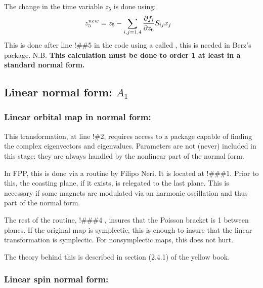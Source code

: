 \documentclass{hitec}     %
\begin{document}
{{{{{{The change in the time variable $z_5$ is done using:
%
\begin{align} {z}_{5}^{new}&={z}_{5}-\sum\limits_{i,j=1,4}^{} {\partial {f}_{i} \over \partial {z}_{6}}{S}_{ij}{x}_{j}\label{tlie5}\end{align}
%
This is done after line !\#\#5 in the code using a  called , this is needed in Berz's package.
\vskip 0.5cm
{N.B. \bf This calculation must be done to order 1 at least in a standard normal form.}


\subsection{Linear   normal form: $A_1$ }\label{s:lineara}

\subsubsection{Linear orbital map in normal form: }\label{s:linearorb}

This transformation, at line !\#2, requires access to a package capable of finding the complex eigenvectors and eigenvalues.
Parameters are not (never) included in this stage: they are always handled by the nonlinear part of the normal form.

In FPP,  this is done via a routine by Filipo Neri. It is located at !\#\#\#1. Prior to this, the coasting plane, if it exists, is relegated to the last plane. This is necessary if some magnets are modulated via an harmonic oscillation and thus part of the normal form.  

The rest of the routine, !\#\#\#4 ,  insures that the Poisson bracket is 1 between planes. If the original map is symplectic, this is enough to insure that the linear transformation is symplectic. For nonsymplectic maps, this does not hurt.

The theory behind this is described in section (2.4.1) of the yellow book\cite{thebook}.

\subsubsection{Linear spin  normal form: }\label{s:linearspin}

}}}}}}
\end{document}
